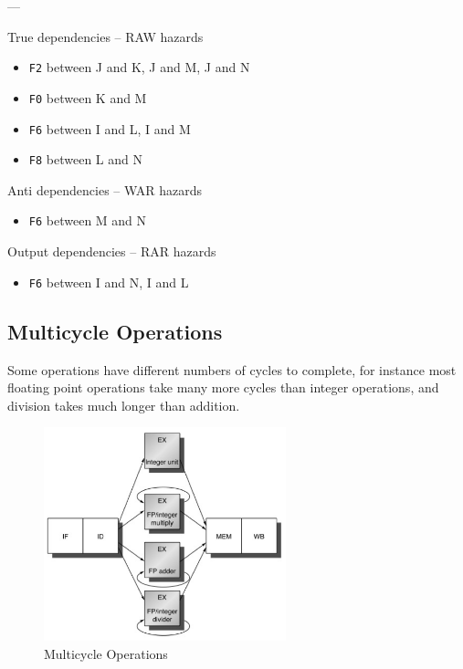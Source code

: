 \documentclass{article}
\begin{document}
---

\noindent True dependencies -- RAW hazards 

\begin{itemize}

\item \texttt{F2} between J and K, J and M, J and N
\item \texttt{F0} between K and M
\item \texttt{F6} between I and L, I and M
\item \texttt{F8} between L and N
\end{itemize}

\noindent Anti dependencies -- WAR hazards

\begin{itemize}

\item \texttt{F6} between M and N  
\end{itemize}

\noindent Output dependencies -- RAR hazards 

\begin{itemize}
\item \texttt{F6} between I and N, I and L
\end{itemize}

\subsection{Multicycle Operations}

Some operations have different numbers of cycles to complete, for instance most floating point operations take many more cycles than integer operations, and division takes much longer than addition. 


\begin{figure}[ht!]
\centering
\includegraphics[width=70mm]{img/MulticycleOperations.png}
\caption{Multicycle Operations}
\end{figure}
\end{document}
